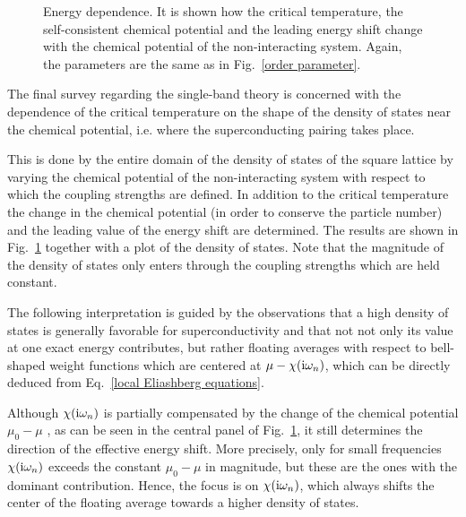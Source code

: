 \begin{figure}
    \small
    \centering
    
    
    
    \caption[Energy dependence of the critical state]{
        Energy dependence. It is shown how the critical temperature, the
        self-consistent chemical potential and the leading energy shift change
        with the chemical potential of the non-interacting system. Again, the
        parameters are the same as in Fig.~\ref{order parameter}.}
    \label{energy dependence}
\end{figure}
%
The final survey regarding the single-band  theory is concerned
with the dependence of the critical temperature on the shape of the density of
states near the chemical potential, i.e. where the superconducting pairing takes
place.

This is done by  the entire domain of the density of states of the
square lattice by varying the chemical potential of the non-interacting system
with respect to which the coupling strengths are defined. In addition to the
critical temperature the change in the chemical potential (in order to conserve
the particle number) and the leading value of the energy shift are determined.
The results are shown in Fig.~\ref{energy dependence} together with a plot of
the density of states. Note that the magnitude of the density of states only
enters through the coupling strengths which are held constant.

The following interpretation is guided by the observations that a high density
of states is generally favorable for superconductivity and that not not only its
value at one exact energy contributes, but rather floating averages with respect
to bell-shaped weight functions which are centered at $\mu - \chi(\mathrm i \omega_n)$,
which can be directly deduced from Eq.~\ref{local Eliashberg equations}.

Although $\chi(\mathrm i \omega_n)$ is partially compensated by the change of the
chemical potential $\mu_0 - \mu$ \cite[80]{AllenMitrovic82}, as can be seen in
the central panel of Fig.~\ref{energy dependence}, it still determines the
direction of the effective energy shift. More precisely, only for small
 frequencies $\chi(\mathrm i \omega_n)$ exceeds the constant $\mu_0 -
\mu$ in magnitude, but these are the ones with the dominant contribution. Hence,
the focus is on $\chi(\mathrm i \omega_n)$, which always shifts the center of the
floating average towards a higher density of states.

